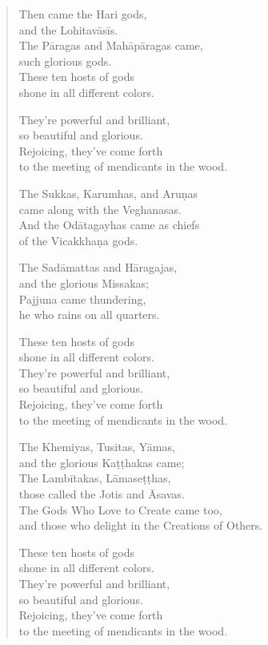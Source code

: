 \documentclass[12pt,openany]{book}%
\begin{document}
\begin{verse}
Then came the Hari gods, \\
and the \textsanskrit{Lohitavāsīs}. \\
The \textsanskrit{Pāragas} and \textsanskrit{Mahāpāragas} came, \\
such glorious gods. \\
These ten hosts of gods \\
shone in all different colors. 

They’re powerful and brilliant, \\
so beautiful and glorious. \\
Rejoicing, they’ve come forth \\
to the meeting of mendicants in the wood. 

The Sukkas, Karumhas, and \textsanskrit{Aruṇas} \\
came along with the Veghanasas. \\
And the \textsanskrit{Odātagayhas} came as chiefs \\
of the \textsanskrit{Vicakkhaṇa} gods. 

The \textsanskrit{Sadāmattas} and \textsanskrit{Hāragajas}, \\
and the glorious Missakas; \\
Pajjuna came thundering, \\
he who rains on all quarters. 

These ten hosts of gods \\
shone in all different colors. \\
They’re powerful and brilliant, \\
so beautiful and glorious. \\
Rejoicing, they’ve come forth \\
to the meeting of mendicants in the wood. 

The Khemiyas, Tusitas, \textsanskrit{Yāmas}, \\
and the glorious \textsanskrit{Kaṭṭhakas} came; \\
The \textsanskrit{Lambītakas}, \textsanskrit{Lāmaseṭṭhas}, \\
those called the Jotis and Āsavas. \\
The Gods Who Love to Create came too, \\
and those who delight in the Creations of Others. 

These ten hosts of gods \\
shone in all different colors. \\
They’re powerful and brilliant, \\
so beautiful and glorious. \\
Rejoicing, they’ve come forth \\
to the meeting of mendicants in the wood. 


\end{verse}
\end{document}
